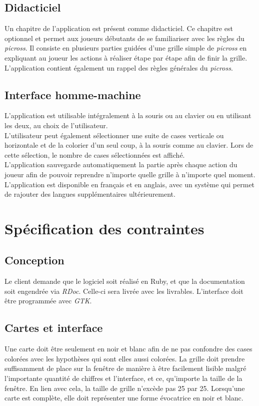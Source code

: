 \documentclass{report}
\begin{document}
		\section{Didacticiel}
			Un chapitre de l'application est présent comme didacticiel. Ce chapitre est optionnel et permet aux joueurs débutants de se familiariser avec les règles du \textit{picross}. Il consiste en plusieurs parties guidées d'une grille simple de \textit{picross} en expliquant au joueur les actions à réaliser étape par étape afin de finir la grille. L'application contient également un rappel des règles générales du \textit{picross}.
			
		\section{Interface homme-machine}
			L'application est utilisable intégralement à la souris ou au clavier ou en utilisant les deux, au choix de l'utilisateur.\\
			L'utilisateur peut également sélectionner une suite de cases verticale ou horizontale et de la colorier d'un seul coup, à la souris comme au clavier. Lors de cette sélection, le nombre de cases sélectionnées est affiché.\\
			L'application sauvegarde automatiquement la partie après chaque action du joueur afin de pouvoir reprendre n'importe quelle grille à n'importe quel moment.
			L'application est disponible en français et en anglais, avec un système qui permet de rajouter des langues supplémentaires ultérieurement.
			
\chapter{Spécification des contraintes}

	\section{Conception}
		Le client demande que le logiciel soit réalisé en Ruby, et que la documentation soit engendrée via \textit{RDoc}. Celle-ci sera livrée avec les livrables. L'interface doit être programmée avec \textit{GTK}.
		
	\section{Cartes et interface}
		Une carte doit être seulement en noir et blanc afin de ne pas confondre des cases colorées avec les hypothèses qui sont elles aussi colorées.
		La grille doit prendre suffisamment de place sur la fenêtre de manière à être facilement lisible malgré l'importante quantité de chiffres et l'interface, et ce, qu'importe la taille de la fenêtre. En lien avec cela, la taille de grille n'excède pas 25 par 25.
		Lorsqu'une carte est complète, elle doit représenter une forme évocatrice en noir et blanc.
	
\end{document}
